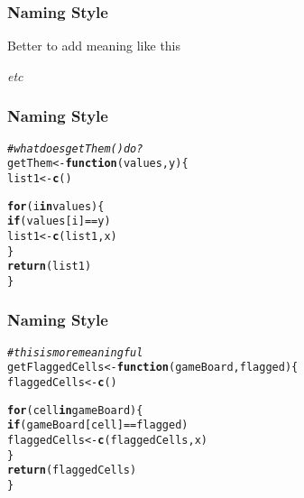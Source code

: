 \documentclass[12pt]{beamer}\usepackage[]{graphicx}\usepackage[]{color}
\makeatletter
\newcommand{\hlcom}[1]{\textcolor[rgb]{0.678,0.584,0.686}{\textit{#1}}}%
\newcommand{\hlopt}[1]{\textcolor[rgb]{0,0,0}{#1}}%
\newcommand{\hlstd}[1]{\textcolor[rgb]{0.345,0.345,0.345}{#1}}%
\newcommand{\hlkwa}[1]{\textcolor[rgb]{0.161,0.373,0.58}{\textbf{#1}}}%
\newcommand{\hlkwb}[1]{\textcolor[rgb]{0.69,0.353,0.396}{#1}}%
\newcommand{\hlkwc}[1]{\textcolor[rgb]{0.333,0.667,0.333}{#1}}%
\newcommand{\hlkwd}[1]{\textcolor[rgb]{0.737,0.353,0.396}{\textbf{#1}}}%
\newenvironment{kframe}{%
 \def\at@end@of@kframe{}%
 \ifinner\ifhmode%
  \def\at@end@of@kframe{\end{minipage}}%
  \begin{minipage}{\columnwidth}%
 \fi\fi%
 \def\FrameCommand##1{\hskip\@totalleftmargin \hskip-\fboxsep
 \colorbox{shadecolor}{##1}\hskip-\fboxsep
     \hskip-\linewidth \hskip-\@totalleftmargin \hskip\columnwidth}%
 \MakeFramed {\advance\hsize-\width
   \@totalleftmargin\z@ \linewidth\hsize
   \@setminipage}}%
 {\par\unskip\endMakeFramed%
 \at@end@of@kframe}
\newenvironment{knitrout}{}{} %
\makeatother
\begin{document}

\begin{frame}[fragile]
\frametitle{Naming Style}

Better to add meaning like this
\bi
  \item {}
  \item {}
  \item {}
  \item {}
  \item {}
  \item {}
  \item \textit{etc}
\ei

\end{frame}


\begin{frame}[fragile]
\frametitle{Naming Style}

\begin{knitrout}\footnotesize
{}\color{fgcolor}\begin{kframe}
\begin{alltt}
\hlcom{# what does getThem() do?}
\hlstd{getThem} \hlkwb{<-} \hlkwa{function}\hlstd{(}\hlkwc{values}\hlstd{,} \hlkwc{y}\hlstd{) \{}
  \hlstd{list1} \hlkwb{<-} \hlkwd{c}\hlstd{()}

  \hlkwa{for} \hlstd{(i} \hlkwa{in} \hlstd{values) \{}
    \hlkwa{if} \hlstd{(values[i]} \hlopt{==} \hlstd{y)}
      \hlstd{list1} \hlkwb{<-} \hlkwd{c}\hlstd{(list1, x)}
  \hlstd{\}}
  \hlkwd{return}\hlstd{(list1)}
\hlstd{\}}
\end{alltt}
\end{kframe}
\end{knitrout}

\end{frame}


\begin{frame}[fragile]
\frametitle{Naming Style}

\begin{knitrout}\footnotesize
{}\color{fgcolor}\begin{kframe}
\begin{alltt}
\hlcom{# this is more meaningful}
\hlstd{getFlaggedCells} \hlkwb{<-} \hlkwa{function}\hlstd{(}\hlkwc{gameBoard}\hlstd{,} \hlkwc{flagged}\hlstd{) \{}
  \hlstd{flaggedCells} \hlkwb{<-} \hlkwd{c}\hlstd{()}

  \hlkwa{for} \hlstd{(cell} \hlkwa{in} \hlstd{gameBoard) \{}
    \hlkwa{if} \hlstd{(gameBoard[cell]} \hlopt{==} \hlstd{flagged)}
      \hlstd{flaggedCells} \hlkwb{<-} \hlkwd{c}\hlstd{(flaggedCells, x)}
  \hlstd{\}}
  \hlkwd{return}\hlstd{(flaggedCells)}
\hlstd{\}}
\end{alltt}
\end{kframe}
\end{knitrout}

\end{frame}
\end{document}
